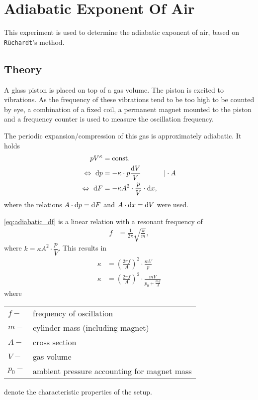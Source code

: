\chapter{Adiabatic Exponent Of Air}
This experiment is used to determine the adiabatic exponent of air, based on \texttt{Rüchardt}'s method.

\section{Theory}
A glass piston is placed on top of a gas volume.
The piston is excited to vibrations.
As the frequency of these vibrations tend to be too high to be counted by eye, a combination of a fixed coil, a permanent magnet mounted to the piston and a frequency counter is used to measure the oscillation frequency.

The periodic expansion/compression of this gas is approximately adiabatic. It holds
\begin{alignat}{3}
	pV^{\kappa} &= \text{const.} \nonumber \\
	\Leftrightarrow\ \text{d} p &= -\kappa\cdot p\frac{\text{d} V}{V}&|\cdot A \nonumber \\
	\Leftrightarrow\ \text{d} F &= -\kappa A^2\cdot\frac{p}{V}\cdot\text{d} x, \label{eq:adiabatic_df}
\end{alignat}
where the relations $A\cdot \text{d} p=\text{d} F$ and $A\cdot\text{d} x=\text{d} V$ were used.

\autoref{eq:adiabatic_df} is a linear relation with a resonant frequency of
\begin{align*}
	f&=\frac{1}{2\pi}\sqrt{\frac{k}{m}},
\end{align*}
where $k=\kappa A^2\cdot\dfrac{p}{V}$.
This results in
\begin{align}\label{eq:kappa}
	\kappa&=\left(\frac{2\pi f}{A}\right)^2\cdot\frac{mV}{p} \nonumber \\
	\kappa&=\left(\frac{2\pi f}{A}\right)^2\cdot\frac{mV}{p_0+\frac{mg}{A}}
\end{align}
where\par
\begin{tabular}{ll}
	$f-$	&	frequency of oscillation \\
	$m-$	&	cylinder mass (including magnet) \\
	$A-$	&	cross section \\
	$V-$	&	gas volume \\
	$p_0-$	&	ambient pressure accounting for magnet mass\\
\end{tabular}\par
denote the characteristic properties of the setup.

